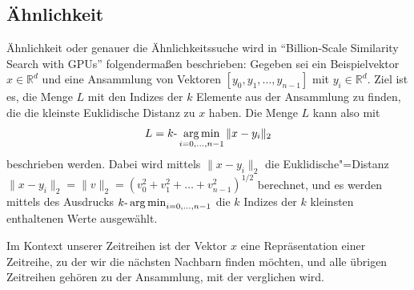 \subsection{Ähnlichkeit}\label{subsec:aehnlichkeit}
Ähnlichkeit oder genauer die Ähnlichkeitssuche wird in "`Billion-Scale Similarity Search with GPUs"' \cite[Ch. 2]{faissAehnlichkeitssuche} folgendermaßen beschrieben: Gegeben sei ein Beispielvektor $x \in \mathbb{R}^d$ und eine Ansammlung von Vektoren $[y_0,y_1,\ldots,y_{n-1}]$ mit $y_i \in \mathbb{R}^d$. Ziel ist es, die Menge $L$ mit den Indizes der $k$ Elemente aus der Ansammlung zu finden, die die kleinste Euklidische Distanz zu $x$ haben. Die Menge $L$ kann also mit
\[L= k \text{-}\operatorname*{arg\,min}_{i=0,\ldots,n-1}\|x-y_i\|_2\]
beschrieben werden. Dabei wird mittels $\|x-y_i\|_2$ die Euklidische"=Distanz \\ $\|x-y_i\|_2=\|v\|_2 = (v_0^2+v_1^2+ \ldots +v_{n-1}^2)^{1/2}$ berechnet, und es werden mittels  des Ausdrucks $k\text{-}\operatorname*{arg\,min}_{i=0,\ldots,n-1}$ die $k$ Indizes der $k$ kleinsten enthaltenen Werte ausgewählt.

Im Kontext unserer Zeitreihen ist der Vektor $x$ eine Repräsentation einer Zeitreihe, zu der wir die nächsten Nachbarn finden möchten, und alle übrigen Zeitreihen gehören zu der Ansammlung, mit der verglichen wird.